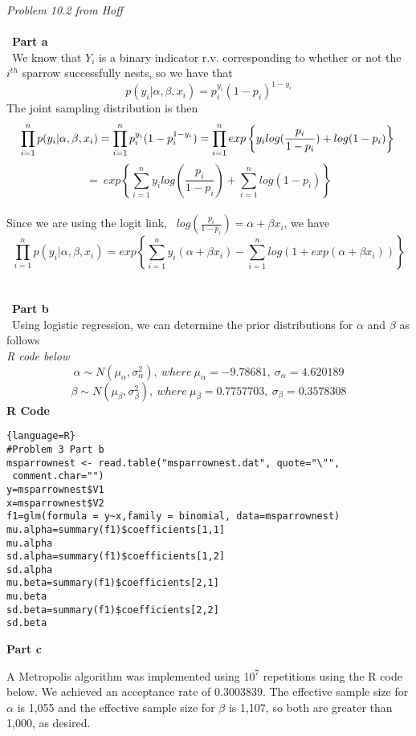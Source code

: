 \documentclass[12pt]{article}
\newenvironment{problem}[2][Problem]{\begin{trivlist}
\item[\hskip \labelsep {\bfseries #1}\hskip \labelsep {\bfseries #2.}]}{\end{trivlist}}
\begin{document}
\begin{problem}{3} \textit{Problem 10.2 from Hoff}\\
\\\
\textbf{Part a}
\\\
We know that $Y_{i}$ is a binary indicator r.v. corresponding to whether or not the $i^{th}$ sparrow successfully nests, so we have that \\
$$p(y_{i}|\alpha,\beta,x_{i})=p_{i}^{y_{i}}(1-p_{i})^{1-y_{i}}$$
The joint sampling distribution is then\\
$$\prod_{i=1}^{n} p(y_{i}|\alpha,\beta,x_{i})=\prod_{i=1}^{n}p_{i}^{y_{i}}(1-p_{i}^{1-y_{i}})\\
=\prod_{i=1}^{n} exp\left\lbrace y_{i}log(\frac{p_{i}}{1-p_{i}})+log(1-p_{i})\right\rbrace\\
$$ $$ = \ exp\left\lbrace \sum_{i=1}^{n}y_{i}log(\frac{p_{i}}{1-p_{i}})+\sum_{i=1}^{n}log(1-p_{i})\right\rbrace$$\\
Since we are using the logit link, \ $log(\frac{p_{i}}{1-p_{i}})=\alpha+\beta x_{i}$, we have
$$\prod_{i=1}^{n}p(y_{i}|\alpha,\beta,x_{i})=exp\left\lbrace\sum_{i=1}^{n}y_{i}(\alpha+\beta x_{i})-\sum_{i=1}^{n}log(1+exp(\alpha+\beta x_{i}))\right\rbrace$$\\
\\\
\textbf{Part b}
\\\
Using logistic regression, we can determine the prior distributions for $\alpha$ and $\beta$ as follows \\
\textit{R code below}\\
$$ \alpha \sim N(\mu_{\alpha},\sigma_{\alpha}^{2}), \ where \ \mu_{\alpha}=-9.78681, \ \sigma_{\alpha}=4.620189$$
$$\beta \sim N(\mu_{\beta},\sigma_{\beta}^{2}), \ where \ \mu_{\beta}=0.7757703, \ \sigma_{\beta}=0.3578308$$
\textbf{R Code}
\begin{lstlisting}{language=R}
#Problem 3 Part b
msparrownest <- read.table("msparrownest.dat", quote="\"",
 comment.char="")
y=msparrownest$V1
x=msparrownest$V2
f1=glm(formula = y~x,family = binomial, data=msparrownest)
mu.alpha=summary(f1)$coefficients[1,1]
mu.alpha
sd.alpha=summary(f1)$coefficients[1,2] 
sd.alpha
mu.beta=summary(f1)$coefficients[2,1]
mu.beta
sd.beta=summary(f1)$coefficients[2,2]
sd.beta
\end{lstlisting}
\newpage
\begin{flushleft}
\textbf{Part c}
\end{flushleft}
A Metropolis algorithm was implemented using $10^{7}$ repetitions using the R code below. We achieved an acceptance rate of 0.3003839. The effective sample size for $\alpha$ is 1,055 and the effective sample size for $\beta$ is 1,107,  so both are greater than 1,000, as desired. \\

\end{problem}
\end{document}
